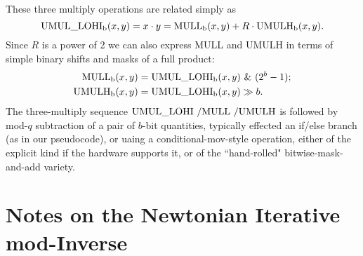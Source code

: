 \documentclass{article}
\begin{document}
\noindent These three multiply operations are related simply as
$$
{\rm UMUL\_LOHI_b}(x,y) = x \cdot y = {\rm MULL_b}(x,y) + R \cdot {\rm UMULH_b}(x,y) .
$$
Since $R$ is a power of 2 we can also express MULL and UMULH in terms of simple binary shifts and masks of a full product:
\begin{align}
\nonumber	{\rm MULL_b}(x,y) &= {\rm UMUL\_LOHI_b}(x,y)\ \&\ (2^b - 1) ;\\
\nonumber	{\rm UMULH_b}(x,y) &= {\rm UMUL\_LOHI_b}(x,y) \gg b .
\end{align}
The three-multiply sequence ${\rm UMUL\_LOHI~/ MULL~/ UMULH}$ is followed by mod-$q$ subtraction of a pair of $b$-bit quantities, typically effected an if/else branch (as in our pseudocode), or uaing a conditional-mov-style operation, either of the explicit kind if the hardware supports it, or of the ``hand-rolled" bitwise-mask-and-add variety.



\section{Notes on the Newtonian Iterative mod-Inverse}
\label{sect:modinv}
\end{document}
